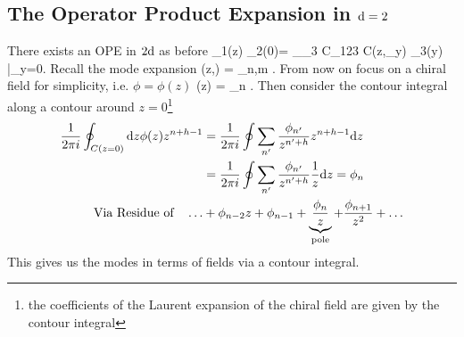 \subsection{The Operator Product Expansion in $\mathrm{d}=2$}
There exists an OPE in $2\mathrm{d}$ as before
\be 
\phi_1(z) \phi_2(0)= \sum_{\phi_3} C_{123} C(z,\partial_y) \phi_3(y) |_{y=0}.
\ee 
Recall the mode expansion
\bse 
\phi(z,\z) = \sum_{n,m} .
\ese 
From now on focus on a chiral field for simplicity, i.e. $\phi=\phi(z)$
\bse 
\phi(z) = \sum_n .
\ese 
Then consider the contour integral along a contour around $z=0$\footnote{the coefficients of the Laurent expansion of the chiral field are given by the contour integral}
\begin{align*}
\frac{1}{2\pi i} \oint_{C(z=0)} \mathrm{d} z\phi(z) z^{n+h-1} &= \frac{1}{2\pi i} \oint \sum_{n^\prime} \frac{\phi_{n^\prime}}{z^{n^\prime +h}} z^{n+h-1} \mathrm{d} z \\
&= \frac{1}{2 \pi i} \oint \sum_{n^\prime} \frac{\phi_{n^\prime}}{z^{n^\prime +h}} \frac{1}{z} \mathrm{d} z = \phi_n \\
\text{Via Residue of} \quad \dots &+ \phi_{n-2} z + \phi_{n-1} + \underbrace{\frac{\phi_n}{z}}_{\text{pole}} + \frac{\phi_{n+1}}{z^2} + \dots
\end{align*}
This gives us the modes in terms of fields via a contour integral.
